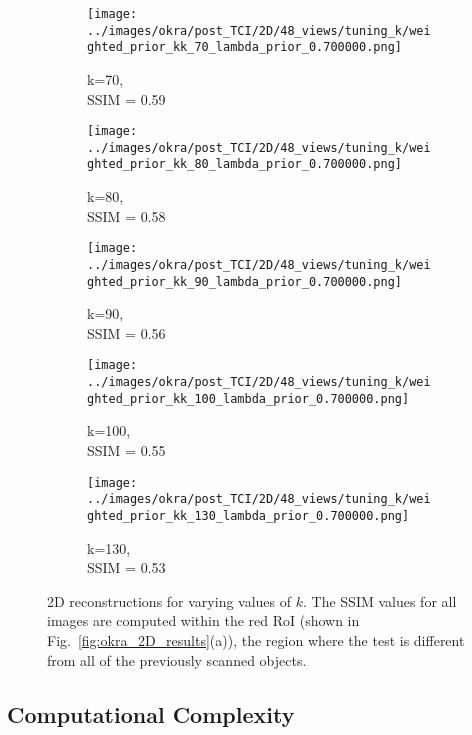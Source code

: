 \documentclass[journal]{IEEEtran}
\begin{document}
\begin{figure}[h]
\begin{subfigure}[b]{0.24\linewidth}
        \texttt{[image: ../images/okra/post\_TCI/2D/48\_views/tuning\_k/weighted\_prior\_kk\_70\_lambda\_prior\_0.700000.png]}
        \caption{k=70,\\ SSIM = 0.59}
     \end{subfigure}
  \begin{subfigure}[b]{0.24\linewidth}
        \texttt{[image: ../images/okra/post\_TCI/2D/48\_views/tuning\_k/weighted\_prior\_kk\_80\_lambda\_prior\_0.700000.png]}
        \caption{k=80,\\ SSIM = 0.58}
     \end{subfigure}
   \begin{subfigure}[b]{0.24\linewidth}
        \texttt{[image: ../images/okra/post\_TCI/2D/48\_views/tuning\_k/weighted\_prior\_kk\_90\_lambda\_prior\_0.700000.png]}
        \caption{k=90,\\ SSIM = 0.56}
     \end{subfigure}
   \begin{subfigure}[b]{0.24\linewidth}
        \texttt{[image: ../images/okra/post\_TCI/2D/48\_views/tuning\_k/weighted\_prior\_kk\_100\_lambda\_prior\_0.700000.png]}
        \caption{k=100,\\ SSIM = 0.55}
     \end{subfigure}
   \begin{subfigure}[b]{0.24\linewidth}
        \texttt{[image: ../images/okra/post\_TCI/2D/48\_views/tuning\_k/weighted\_prior\_kk\_130\_lambda\_prior\_0.700000.png]}
        \caption{k=130,\\ SSIM = 0.53}
     \end{subfigure}
    \caption{2D reconstructions for varying values of $k$. The SSIM values for all images are computed within the red RoI (shown in Fig.~\ref{fig:okra_2D_results}(a)), the region where the test is different from all of the previously scanned objects.}
\label{fig:reconstructions_as_k_varies}
\end{figure}
\subsection{Computational Complexity}
\end{document}
